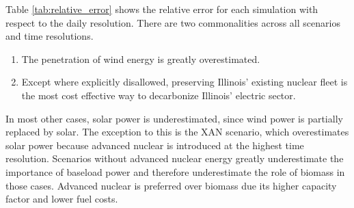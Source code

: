 Table \ref{tab:relative_error} shows the relative error for each simulation with
respect to the daily resolution. There are two commonalities across all scenarios
and time resolutions.
\begin{enumerate}
  \item The penetration of wind energy is greatly overestimated.
  \item Except where explicitly disallowed, preserving Illinois' existing nuclear
  fleet is the most cost effective way to decarbonize Illinois' electric sector.
\end{enumerate}
In most other cases, solar power is underestimated, since wind power is partially
replaced by solar. The exception to this is the XAN scenario, which overestimates
solar power because advanced nuclear is introduced at the highest time resolution.
Scenarios without advanced nuclear energy greatly underestimate the importance of
baseload power and therefore underestimate the role of biomass in those cases.
Advanced nuclear is preferred over biomass due its higher capacity factor and lower
fuel costs.

\begin{table}[H]
  \centering
  \caption{Relative Error in Total Capacity}
  \label{tab:relative_error}
\end{table}

